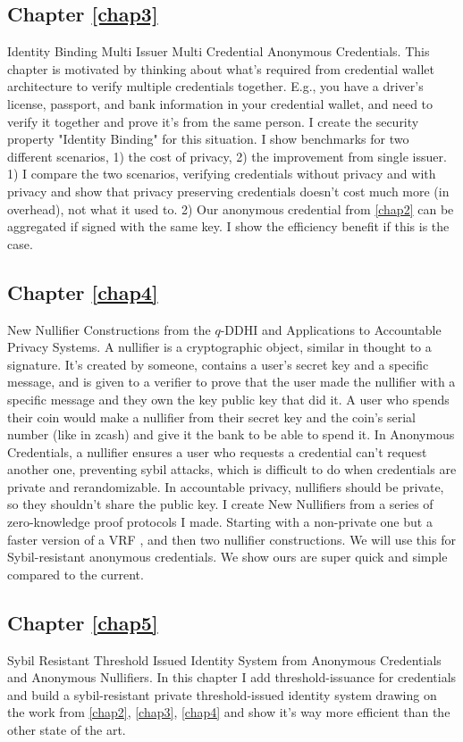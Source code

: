 \subsection{Chapter \ref{chap3}}
Identity Binding Multi Issuer Multi Credential Anonymous Credentials. This chapter is motivated by thinking about what's required from credential wallet architecture to verify multiple credentials together. E.g., you have a driver's license, passport, and bank information in your credential wallet, and need to verify it together and prove it's from the same person. I create the security property "Identity Binding" for this situation. I show benchmarks for two different scenarios, 1) the cost of privacy, 2) the improvement from single issuer.
1) I compare the two scenarios, verifying credentials without privacy and with privacy and show that privacy preserving credentials doesn't cost much more (in overhead), not what it used to. 2) Our anonymous credential from \ref{chap2} can be aggregated if signed with the same key. I show the efficiency benefit if this is the case. 

\subsection{Chapter \ref{chap4}}
New Nullifier Constructions from the $q$-DDHI and Applications to Accountable Privacy Systems. A nullifier is a cryptographic object, similar in thought to a signature. It's created by someone, contains a user's secret key and a specific message, and is given to a verifier to prove that the user made the nullifier with a specific message and they own the key public key that did it. A user who spends their coin would make a nullifier from their secret key and the coin's serial number (like in zcash) and give it the bank to be able to spend it. In Anonymous Credentials, a nullifier ensures a user who requests a credential can't request another one, preventing sybil attacks, which is difficult to do when credentials are private and rerandomizable.
In accountable privacy, nullifiers should be private, so they shouldn't share the public key. 
I create New Nullifiers from a series of zero-knowledge proof protocols I made. Starting with a non-private one but a faster version of a VRF \cite{hutchison_verifiable_2005}, and then two nullifier constructions. We will use this for Sybil-resistant anonymous credentials. We show ours are super quick and simple compared to the current.

\subsection{Chapter \ref{chap5}}
Sybil Resistant Threshold Issued Identity System from Anonymous Credentials and Anonymous Nullifiers. In this chapter I add threshold-issuance for credentials and build a sybil-resistant private threshold-issued identity system drawing on the work from \ref{chap2}, \ref{chap3}, \ref{chap4} and show it's way more efficient than the other state of the art.

